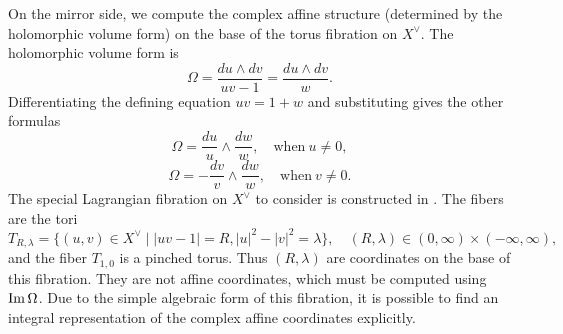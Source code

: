 \documentclass[12pt]{amsart}
\begin{document}



On the mirror side, we compute the complex affine structure
(determined by the holomorphic volume form) on the base of the torus
fibration on $X^\vee$. The holomorphic volume form is
\begin{equation}
  \label{eq:vol-form-uv}
  \Omega = \frac{du\wedge dv}{uv-1} = \frac{du\wedge dv}{w}.
\end{equation}
Differentiating the defining equation $uv = 1 + w$ and substituting
gives the other formulas
\begin{equation}
 \label{eq:vol-form-uw}
 \Omega = \frac{du}{u}\wedge \frac{dw}{w}, \quad \text{when}\ u \neq 0,
\end{equation}
\begin{equation}
  \label{eq:vol-form-vw}
  \Omega = -\frac{dv}{v}\wedge \frac{dw}{w}, \quad \text{when}\ v \neq 0.
\end{equation}
The special Lagrangian fibration on $X^\vee$ to consider is constructed
in \cite{auroux07}. The fibers are the tori
\begin{equation}
  \label{eq:slags}
  T_{R,\lambda} = \{(u,v)\in X^\vee \mid |uv-1| = R, |u|^2-|v|^2 =
  \lambda\}, \quad (R,\lambda) \in (0,\infty)\times (-\infty,\infty),
\end{equation}
and the fiber $T_{1,0}$ is a pinched torus. Thus $(R,\lambda)$ are
coordinates on the base of this fibration. They are not affine
coordinates, which must be computed using $\operatorname{Im} \Omega$. Due to the
simple algebraic form of this fibration, it is possible to find an
integral representation of the complex affine coordinates
explicitly.
\end{document}
